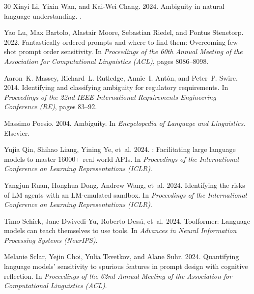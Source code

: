 \documentclass[11pt,a4paper]{article}
\begin{document}
\begin{thebibliography}{30}
Xinyi Li, Yixin Wan, and Kai-Wei Chang. 2024.
\newblock Ambiguity in natural language understanding.
.

Yao Lu, Max Bartolo, Alastair Moore, Sebastian Riedel, and Pontus Stenetorp. 2022.
\newblock Fantastically ordered prompts and where to find them: Overcoming few-shot prompt order sensitivity.
\newblock In {\em Proceedings of the 60th Annual Meeting of the Association for Computational Linguistics (ACL)}, pages 8086--8098.

Aaron~K. Massey, Richard~L. Rutledge, Annie~I. Ant\'{o}n, and Peter~P. Swire. 2014.
\newblock Identifying and classifying ambiguity for regulatory requirements.
\newblock In {\em Proceedings of the 22nd IEEE International Requirements Engineering Conference (RE)}, pages 83--92.

Massimo Poesio. 2004.
\newblock Ambiguity.
\newblock In {\em Encyclopedia of Language and Linguistics}. Elsevier.

Yujia Qin, Shihao Liang, Yining Ye, et~al. 2024.
: Facilitating large language models to master 16000+ real-world {API}s.
\newblock In {\em Proceedings of the International Conference on Learning Representations (ICLR)}.

Yangjun Ruan, Honghua Dong, Andrew Wang, et~al. 2024.
\newblock Identifying the risks of {LM} agents with an {LM}-emulated sandbox.
\newblock In {\em Proceedings of the International Conference on Learning Representations (ICLR)}.

Timo Schick, Jane Dwivedi-Yu, Roberto Dess\`{i}, et~al. 2024.
\newblock Toolformer: Language models can teach themselves to use tools.
\newblock In {\em Advances in Neural Information Processing Systems (NeurIPS)}.

Melanie Sclar, Yejin Choi, Yulia Tsvetkov, and Alane Suhr. 2024.
\newblock Quantifying language models' sensitivity to spurious features in prompt design with cognitive reflection.
\newblock In {\em Proceedings of the 62nd Annual Meeting of the Association for Computational Linguistics (ACL)}.


\end{thebibliography}
\end{document}
